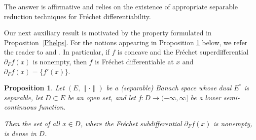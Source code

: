 \documentclass[12pt]{amsart}
\theoremstyle{plain}
\newtheorem{proposition}[theorem]{Proposition}
\theoremstyle{definition}
\theoremstyle{remark}
\def\nn{\|\cdot\|}
\def\nn{\|\cdot\|}
\begin{document}
The answer is affirmative and relies on the existence of appropriate separable reduction techniques for Fr\'echet differentiability.

Our next auxiliary result is motivated by the property formulated in Proposition~\ref{Phelps}.
For the notions appearing in Proposition \ref{111} below, we refer the reader to \cite[p.~317--321]{y1} and \cite[Chapter~11, pp.~625--629]{y2}.
In particular, if $f$ is concave and the Fr\'echet superdifferential $\partial_F f(x)$ is nonempty, then $f$ is Fr\'echet differentiable at $x$ and
$\partial_Ff(x)=\{f'(x)\}$.

\begin{proposition}\label{111} Let $(E,\nn)$ be a (separable) Banach space whose dual $E^*$ is separable,
let $D\subset E$ be an open set, and let $f:D\longrightarrow(-\infty,\infty]$ be a lower semi-continuous function.

\noindent Then the set of all $x\in D$, where the Fr\'echet subdifferential $\partial_F f(x)$
is nonempty, is dense in $D$.
\end{proposition}
\end{document}
